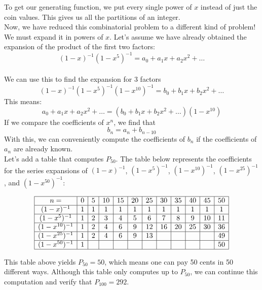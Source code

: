 \documentclass{article}
\theoremstyle{definition}
\theoremstyle{question}
\begin{document}
    \noindent To get our generating function, we put every single power of \(x\) instead of just the coin values. This gives us all the partitions of an integer. \\
    
    \noindent Now, we have reduced this combinatorial problem to a different kind of problem! We must expand it in powers of \(x\). Let's assume we have already obtained the expansion of the product of the first two factors:
    \[
    (1 - x)^{-1}(1 - x^5)^{-1} = a_0 + a_1 x + a_2 x^2 + \dots
    \] \\
    
    \noindent  We can use this to find the expansion for 3 factors
    \[
    (1 - x)^{-1}(1 - x^5)^{-1}(1 - x^{10})^{-1} = b_0 + b_1 x + b_2 x^2 + \dots
    \]
    This means:
    \[
    a_0 + a_1 x + a_2 x^2 + \dots = (b_0 + b_1 x + b_2 x^2 + \dots)(1 - x^{10})
    \]
    If we compare the coefficients of $x^n$, we find that
    \[
    b_n = a_n + b_{n-10}
    \]
    With this, we can conveniently compute the coefficients of $b_n$ if the coefficients of $a_n$ are already known. \\
    
    \noindent Let's add a table that computes $P_{50}$. The table below represents the coefficients for the series expansions of $(1-x)^{-1}$, $(1-x^5)^{-1}$, $(1-x^{10})^{-1}$, $(1-x^{25})^{-1}$, and $(1-x^{50})^{-1}$: 
    
    \[
    \begin{array}{|c|*{11}{c|}}
    \hline
    n = & 0 & 5 & 10 & 15 & 20 & 25 & 30 & 35 & 40 & 45 & 50 \\
    \hline
    (1 - x)^{-1} & 1 & 1 & 1 & 1 & 1 & 1 & 1 & 1 & 1 & 1 & 1 \\
    \hline
    (1 - x^5)^{-1} & 1 & 2 & 3 & 4 & 5 & 6 & 7 & 8 & 9 & 10 & 11 \\
    \hline
    (1 - x^{10})^{-1} & 1 & 2 & 4 & 6 & 9 & 12 & 16 & 20 & 25 & 30 & 36 \\
    \hline
    (1 - x^{25})^{-1} & 1 & 2 & 4 & 6 & 9 & 13 &  &  &  &  & 49 \\
    \hline
    (1 - x^{50})^{-1} & 1 &  &  &  &  &  &  &  &  &  & 50 \\
    \hline
    \end{array}
    \]
    
    \noindent  This table above yields $P_{50} = 50$, which means one can pay 50 cents in 50 different ways. Although this table only computes up to $P_{50}$, we can continue this computation and verify that $P_{100} = 292$.
\end{document}
